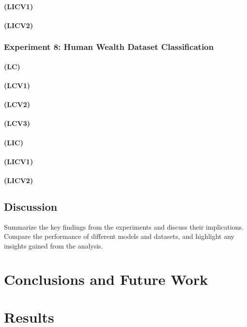 \documentclass[a4paper, 12pt]{report}
\begin{document}
\subsubsection{(LICV1)}
\subsubsection{(LICV2)}

\subsection{Experiment 8: Human Wealth Dataset Classification}
\subsubsection{(LC)}
\subsubsection{(LCV1)}
\subsubsection{(LCV2)}
\subsubsection{(LCV3)}
\subsubsection{(LIC)}
\subsubsection{(LICV1)}
\subsubsection{(LICV2)}

\section{Discussion}

Summarize the key findings from the experiments and discuss their implications. Compare the performance of different models and datasets, and highlight any insights gained from the analysis.

\chapter{Conclusions and Future Work}
\label{ch:Conclusions and Future Work}

\chapter{Results}
\label{ch:Results}


\end{document}
